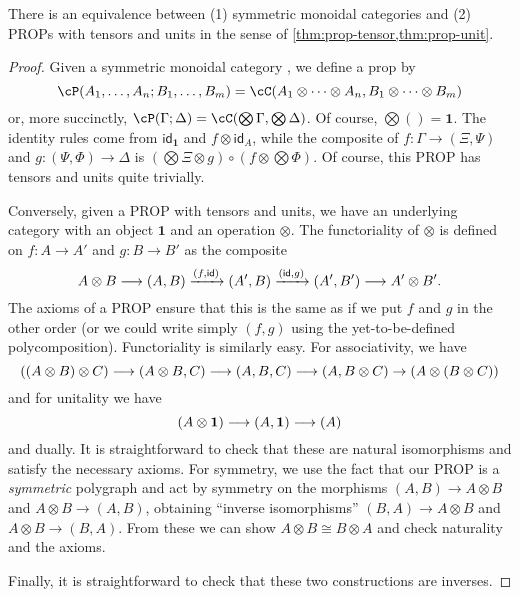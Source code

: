 \documentclass{book}
\def\idfunc{\mathsf{id}}
\def\unit{\mathbf{1}}
\def\one{\mathbf{1}}
\let\tensor\otimes
\let\bigtensor\bigotimes
\begin{document}
\begin{thm}\label{thm:prop-smc}
  There is an equivalence between (1) symmetric monoidal categories and (2) PROPs with tensors and units in the sense of \cref{thm:prop-tensor,thm:prop-unit}.
\end{thm}
\begin{proof}
  Given a symmetric monoidal category \cC, we define a prop \cP by
  \[ \cP(A_1,\dots,A_n ; B_1,\dots,B_m) = \cC(A_1\tensor \cdots\tensor A_n, B_1\tensor\cdots\tensor B_m)\]
  or, more succinctly, $\cP(\Gamma;\Delta) = \cC(\bigtensor\Gamma, \bigtensor\Delta)$.
  Of course, $\bigtensor() = \one$.
  The identity rules come from $\idfunc_\one$ and $f\tensor \idfunc_A$, while the composite of $f:\Gamma\to (\Xi,\Psi)$ and $g:(\Psi,\Phi)\to \Delta$ is $(\bigtensor\Xi \tensor g) \circ (f\tensor \bigtensor \Phi)$.
  Of course, this PROP has tensors and units quite trivially.

  Conversely, given a PROP with tensors and units, we have an underlying category with an object $\one$ and an operation $\tensor$.
  The functoriality of $\tensor$ is defined on $f:A\to A'$ and $g:B\to B'$ as the composite
  \[ A\tensor B \too (A,B) \xto{(f,\idfunc)} (A',B) \xto{(\idfunc,g)} (A',B') \too A'\tensor B'. \]
  The axioms of a PROP ensure that this is the same as if we put $f$ and $g$ in the other order (or we could write simply $(f,g)$ using the yet-to-be-defined polycomposition).
  Functoriality is similarly easy.
  For associativity, we have
  \[ ((A\tensor B)\tensor C) \too (A\tensor B,C) \too (A,B,C) \too (A,B\tensor C) \to (A\tensor (B\tensor C)) \]
  and for unitality we have
  \[ (A\tensor \unit) \too (A,\unit) \too (A) \]
  and dually.
  It is straightforward to check that these are natural isomorphisms and satisfy the necessary axioms.
  For symmetry, we use the fact that our PROP is a \emph{symmetric} polygraph and act by symmetry on the morphisms $(A,B)\to A\tensor B$ and $A\tensor B\to (A,B)$, obtaining ``inverse isomorphisms'' $(B,A) \to A\tensor B$ and $A\tensor B \to (B,A)$.
  From these we can show $A\tensor B \cong B\tensor A$ and check naturality and the axioms.

  Finally, it is straightforward to check that these two constructions are inverses.
\end{proof}
\end{document}
